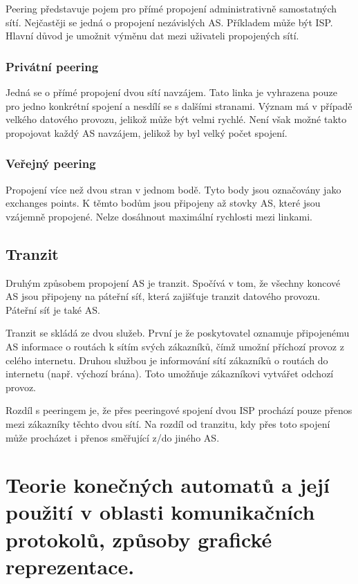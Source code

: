 Peering představuje pojem pro přímé propojení administrativně samostatných sítí.
Nejčastěji se jedná o propojení nezávislých AS.
Příkladem může být ISP.
Hlavní důvod je umožnit výměnu dat mezi uživateli propojených sítí.

\subsubsection{Privátní peering}

Jedná se o přímé propojení dvou sítí navzájem.
Tato linka je vyhrazena pouze pro jedno konkrétní spojení a nesdílí se s dalšími stranami.
Význam má v případě velkého datového provozu, jelikož může být velmi rychlé.
Není však možné takto propojovat každý AS navzájem, jelikož by byl velký počet spojení.

\subsubsection{Veřejný peering}

Propojení více než dvou stran v jednom bodě.
Tyto body jsou označovány jako exchanges points.
K těmto bodům jsou připojeny až stovky AS, které jsou vzájemně propojené.
Nelze dosáhnout maximální rychlosti mezi linkami.

\subsection{Tranzit}

Druhým způsobem propojení AS je tranzit.
Spočívá v tom, že všechny koncové AS jsou připojeny na páteřní síť, která zajišťuje tranzit datového provozu.
Páteřní síť je také AS.

Tranzit se skládá ze dvou služeb.
První je že poskytovatel oznamuje připojenému AS informace o routách k sítím svých zákazníků, čímž umožní příchozí provoz z celého internetu.
Druhou službou je informování sítí zákazníků o routách do internetu (např. výchozí brána).
Toto umožňuje zákazníkovi vytvářet odchozí provoz.

Rozdíl s peeringem je, že přes peeringové spojení dvou ISP prochází pouze přenos mezi zákazníky těchto dvou sítí.
Na rozdíl od tranzitu, kdy přes toto spojení může procházet i přenos směřující z/do jiného AS.


\clearpage
\section{Teorie konečných automatů a její použití v oblasti komunikačních protokolů, způsoby grafické reprezentace.}

